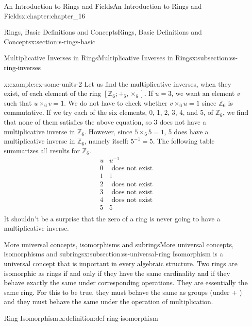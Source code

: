 \documentclass[oneside,10pt,]{book}
\numberwithin{equation}{section}
\begin{document}
\begin{chapterptx}{An Introduction to Rings and Fields}{}{An Introduction to Rings and Fields}{}{}{x:chapter:chapter_16}
\begin{sectionptx}{Rings, Basic Definitions and Concepts}{}{Rings, Basic Definitions and Concepts}{}{}{x:section:s-rings-basic}
\begin{subsectionptx}{Multiplicative Inverses in Rings}{}{Multiplicative Inverses in Rings}{}{}{x:subsection:ss-ring-inverses}
\begin{example}{}{x:example:ex-some-units-2}
Let us find the multiplicative inverses, when they exist, of each element of the ring \([\mathbb{Z}_6; +_6, \times_6]\). If \(u = 3\), we want an element \(v\) such that \(u\times_6v=1\). We do not have to check whether \(v\times_6u=1\) since \(\mathbb{Z}_6\) is commutative. If we try each of the six elements, 0, 1, 2, 3, 4, and 5, of \(\mathbb{Z}_6\), we find that none of them satisfies the above equation, so 3 does not have a multiplicative inverse in \(\mathbb{Z}_6\). However, since \(5\times_6 5=1\), 5 does have a multiplicative inverse in \(\mathbb{Z}_6\), namely itself:  \(5^{-1}=5\). The following table summarizes all results for \(\mathbb{Z}_6\).%
\begin{equation*}
\begin{array}{cc}
u & u^{-1} \\
0 & \textrm{ does} \textrm{ not} \textrm{ exist} \\
1 & 1 \\
2 & \textrm{ does} \textrm{ not} \textrm{ exist} \\
3 & \textrm{ does} \textrm{ not} \textrm{ exist} \\
4 & \textrm{ does} \textrm{ not} \textrm{ exist} \\
5 & 5 \\
\end{array}
\end{equation*}
It shouldn't be a surprise that the zero of a ring is never going to have a multiplicative inverse.%
\end{example}
\end{subsectionptx}
%
%
\typeout{************************************************}
\typeout{************************************************}
%
\begin{subsectionptx}{More universal concepts, isomorphisms and subrings}{}{More universal concepts, isomorphisms and subrings}{}{}{x:subsection:ss-universal-ring}
Isomorphism is a universal concept that is important in every algebraic structure. Two rings are isomorphic as rings if and only if they have the same cardinality and if they behave exactly the same under corresponding operations. They are essentially the same ring. For this to be true, they must behave the same as groups (under + ) and they must behave the same under the operation of multiplication.%
\begin{definition}{Ring Isomorphism.}{x:definition:def-ring-isomorphism}%
%
\label{g:notation:idm546594077168}%

\end{definition}
\end{subsectionptx}
\end{sectionptx}
\end{chapterptx}
\end{document}

